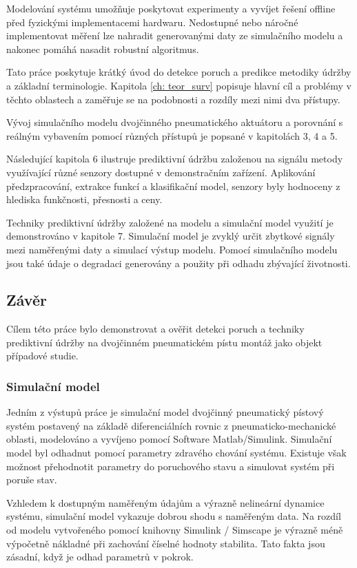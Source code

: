 Modelování systému umožňuje poskytovat experimenty a vyvíjet řešení
offline před fyzickými implementacemi hardwaru. Nedostupné nebo
náročné implementovat měření lze nahradit generovanými daty
ze simulačního modelu a nakonec pomáhá nasadit robustní algoritmus.

Tato práce poskytuje krátký úvod do detekce poruch a predikce
metodiky údržby a základní terminologie.
Kapitola \ref{ch: teor_surv} popisuje hlavní cíl a problémy
v těchto oblastech a zaměřuje se na podobnosti a rozdíly mezi nimi
dva přístupy.

Vývoj simulačního modelu dvojčinného pneumatického aktuátoru a
porovnání s reálným vybavením pomocí různých přístupů je
popsané v kapitolách 3, 4 a 5.

Následující kapitola 6 ilustruje prediktivní údržbu založenou na signálu
metody využívající různé senzory dostupné v demonstračním zařízení.
Aplikování předzpracování, extrakce funkcí a klasifikační model,
senzory byly hodnoceny z hlediska funkčnosti, přesnosti a ceny.

Techniky prediktivní údržby založené na modelu a simulační model
využití je demonstrováno v kapitole 7. Simulační model je zvyklý
určit zbytkové signály mezi naměřenými daty a simulací
výstup modelu. Pomocí simulačního modelu jsou také údaje o degradaci
generovány a použity při odhadu zbývající životnosti.

\subsection*{Závěr}
Cílem této práce bylo demonstrovat a ověřit detekci poruch a
techniky prediktivní údržby na dvojčinném pneumatickém pístu
montáž jako objekt případové studie.

\subsubsection*{Simulační model}

Jedním z výstupů práce je simulační model
dvojčinný pneumatický pístový systém postavený na základě diferenciálních rovnic
z pneumaticko-mechanické oblasti, modelováno a vyvíjeno pomocí
Software Matlab/Simulink. Simulační model byl odhadnut pomocí
parametry zdravého chování systému. Existuje však možnost
přehodnotit parametry do poruchového stavu a simulovat systém při poruše
stav.

Vzhledem k dostupným naměřeným údajům a výrazně nelineární dynamice
systému, simulační model vykazuje dobrou shodu s naměřeným
data. Na rozdíl od modelu vytvořeného pomocí knihovny Simulink / Simscape je
výrazně méně výpočetně nákladné při zachování číselné hodnoty
stabilita. Tato fakta jsou zásadní, když je odhad parametrů v
pokrok.

